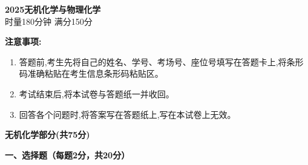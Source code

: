 \begin{center}
    {\LARGE \textbf{2025无机化学与物理化学}} \\[2ex]
    {\large 时量180分钟 \quad 满分150分}
\end{center}

\vspace{0.5cm}
\noindent\textbf{注意事项:}
\begin{enumerate}[label=\arabic*., parsep=0pt, itemsep=0pt]
    \item 答题前,考生先将自己的姓名、学号、考场号、座位号填写在答题卡上,将条形码准确粘贴在考生信息条形码粘贴区。
    \item 考试结束后,将本试卷与答题纸一并收回。
    \item 回答各个问题时,将答案写在答题纸上,写在本试卷上无效。
\end{enumerate}

\vspace{1cm}
\begin{center}
    {\Large \textbf{无机化学部分(共75分)}}
\end{center}

\vspace{0.5cm}
\noindent\textbf{一、选择题（每题2分，共20分）}

